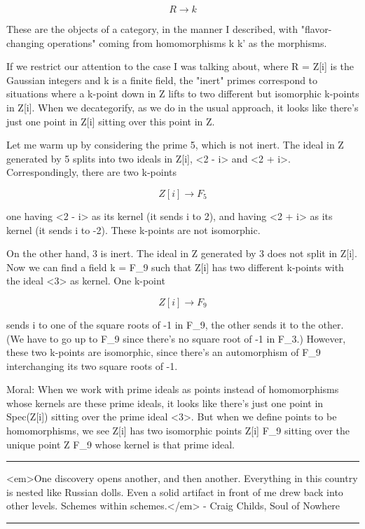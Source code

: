 $$
R \to  k
$$
    

These are the objects of a category, in the manner I described, with
"flavor-changing operations" coming from homomorphisms k \to  k' as the
morphisms.

If we restrict our attention to the case I was talking about, where 
R = Z[i] is the Gaussian integers and k is a finite field, the "inert"
primes correspond to situations where a k-point down in Z lifts to two
different but isomorphic k-points in Z[i].  When we decategorify, as
we do in the usual approach, it looks like there's just one point in
Z[i] sitting over this point in Z.

Let me warm up by considering the prime 5, which is not inert.  The
ideal in Z generated by 5 splits into two ideals in Z[i], <2 - i> and
<2 + i>.  Correspondingly, there are two k-points

$$
Z[i] \to  F_{5}
$$
    

one having <2 - i> as its kernel (it sends i to 2), and having <2 + i>
as its kernel (it sends i to -2).  These k-points are not isomorphic.

On the other hand, 3 is inert.  The ideal in Z generated by 3 does not
split in Z[i].  Now we can find a field k = F_{9} such that
Z[i] has two different k-points with the ideal <3> as kernel.  One
k-point

$$
Z[i] \to  F_{9}
$$
    

sends i to one of the square roots of -1 in F_{9}, the other
sends it to the other.  (We have to go up to F_{9} since
there's no square root of -1 in F_{3}.)  However, these two
k-points are isomorphic, since there's an automorphism of F_{9}
interchanging its two square roots of -1.

Moral: When we work with prime ideals as points instead of
homomorphisms whose kernels are these prime ideals, it looks like
there's just one point in Spec(Z[i]) sitting over the prime ideal <3>.
But when we define points to be homomorphisms, we see Z[i] has two
isomorphic points Z[i] \to  F_{9} sitting over the unique
point Z \to  F_{9} whose kernel is that prime ideal.

\par\noindent\rule{\textwidth}{0.4pt}
<em>One discovery opens another, and then another.  Everything in this
country is nested like Russian dolls.  Even a solid artifact in front
of me drew back into other levels.  Schemes within schemes.</em> - Craig
Childs, Soul of Nowhere

\par\noindent\rule{\textwidth}{0.4pt}

